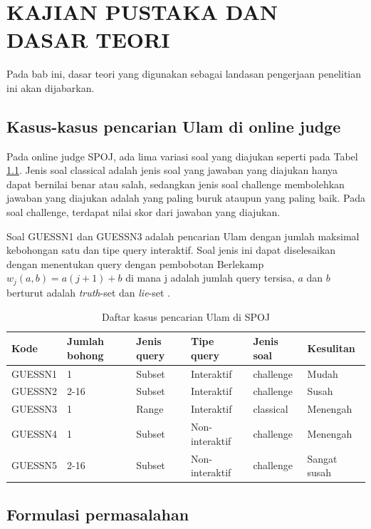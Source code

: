 \chapter {KAJIAN PUSTAKA DAN DASAR TEORI}

Pada bab ini, dasar teori yang digunakan sebagai landasan pengerjaan penelitian ini akan dijabarkan.

\section{Kasus-kasus pencarian Ulam di online judge}

Pada online judge SPOJ, ada lima variasi soal yang diajukan seperti pada Tabel \ref{tab:kasus_spoj}. Jenis soal classical adalah jenis soal yang jawaban yang diajukan hanya dapat bernilai benar atau salah, sedangkan jenis soal challenge membolehkan jawaban yang diajukan adalah yang paling buruk ataupun yang paling baik. Pada soal challenge, terdapat nilai skor dari jawaban yang diajukan.

Soal GUESSN1 dan GUESSN3 adalah pencarian Ulam dengan jumlah maksimal kebohongan satu dan tipe query interaktif. Soal jenis ini dapat diselesaikan dengan menentukan query dengan pembobotan Berlekamp $w_j (a,b)=a(j+1)+b$ di mana j adalah jumlah query tersisa, $a$ dan $b$ berturut adalah \textit{truth}-set dan \textit{lie}-set \cite{Pelc1987}.

\begin{table}[h!]
\caption{Daftar kasus pencarian Ulam di SPOJ}
\label{tab:kasus_spoj}
\begin{center}
\begin{tabular} {|l|l|l|l|l|l|}
\hline
Kode & Jumlah bohong & Jenis query & Tipe query & Jenis soal & Kesulitan \\
\hline
GUESSN1 & 1 & Subset & Interaktif & challenge & Mudah \\
\hline
GUESSN2 & 2-16 & Subset & Interaktif & challenge & Susah  \\
\hline
GUESSN3 & 1 & Range & Interaktif & classical & Menengah \\
\hline
GUESSN4 & 1 & Subset & Non-interaktif & challenge & Menengah \\
\hline
GUESSN5 & 2-16 & Subset & Non-interaktif & challenge & Sangat susah \\
\hline
\end{tabular}
\end{center}
\end{table}


\section{Formulasi permasalahan}

